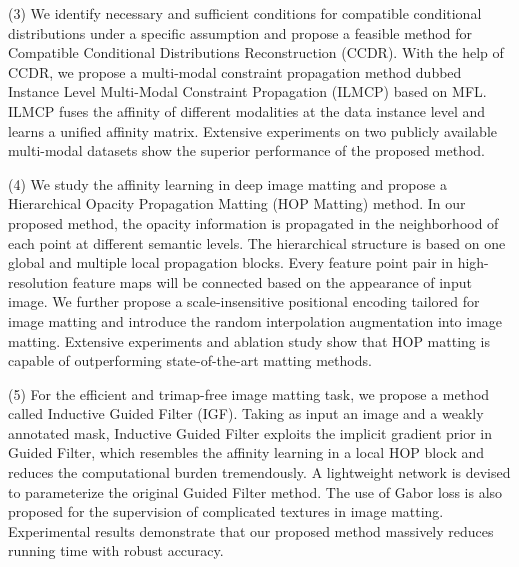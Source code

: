 \begin{enabstract}
  (3) We identify necessary and sufficient conditions for compatible conditional distributions under a specific assumption and propose a feasible method for Compatible Conditional Distributions Reconstruction (CCDR). With the help of CCDR, we propose a multi-modal constraint propagation method dubbed Instance Level Multi-Modal Constraint Propagation (ILMCP) based on MFL. ILMCP fuses the affinity of different modalities at the data instance level and learns a unified affinity matrix. Extensive experiments on two publicly available multi-modal datasets show the superior performance of the proposed method. 

  (4) We study the affinity learning in deep image matting and propose a Hierarchical Opacity Propagation Matting (HOP Matting) method. In our proposed method, the opacity information is propagated in the neighborhood of each point at different semantic levels. The hierarchical structure is based on one global and multiple local propagation blocks. Every feature point pair in high-resolution feature maps will be connected based on the appearance of input image. We further propose a scale-insensitive positional encoding tailored for image matting and introduce the random interpolation augmentation into image matting. Extensive experiments and ablation study show that HOP matting is capable of outperforming state-of-the-art matting methods.

  (5) For the efficient and trimap-free image matting task, we propose a method called Inductive Guided Filter (IGF). Taking as input an image and a weakly annotated mask, Inductive Guided Filter exploits the implicit gradient prior in Guided Filter, which resembles the affinity learning in a local HOP block and reduces the computational burden tremendously. A lightweight network is devised to parameterize the original Guided Filter method. The use of Gabor loss is also proposed for the supervision of complicated textures in image matting.
  Experimental results demonstrate that our proposed method massively reduces running time with robust accuracy.




\end{enabstract}
